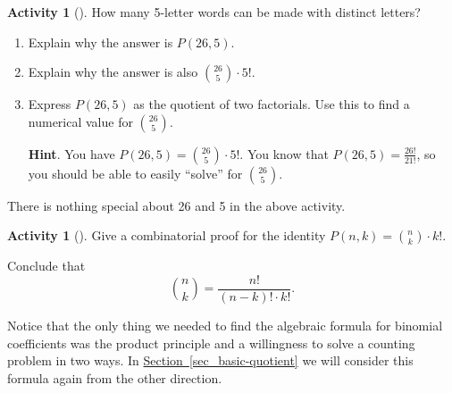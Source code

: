 \documentclass[10pt,]{book}
\theoremstyle{plain}
\theoremstyle{definition}
\theoremstyle{definition}
\theoremstyle{definition}
\newtheorem{activity}[project]{Activity}
\numberwithin{equation}{chapter}
\begin{document}
\begin{activity}[]\label{activity-85}
\hypertarget{p-668}{}%
How many 5-letter words can be made with distinct letters?%
\begin{enumerate}[font=\bfseries,label=(\alph*),ref=\alph*]
\item\label{task-136} \hypertarget{p-669}{}%
Explain why the answer is \(P(26,5)\).%
\item\label{task-137} \hypertarget{p-670}{}%
Explain why the answer is also \(\binom{26}{5}\cdot 5!\).%
\item\label{task-138} \hypertarget{p-671}{}%
Express \(P(26,5)\) as the quotient of two factorials.  Use this to find a numerical value for \(\binom{26}{5}\).%
\par\smallskip%
\noindent\textbf{Hint}.\hypertarget{hint-47}{}\quad%
\hypertarget{p-672}{}%
You have \(P(26,5) = \binom{26}{5}\cdot 5!\).  You know that \(P(26,5) = \frac{26!}{21!}\), so you should be able to easily ``solve'' for \(\binom{26}{5}\).%
\end{enumerate}
\end{activity}
\hypertarget{p-673}{}%
There is nothing special about 26 and 5 in the above activity.%
\begin{activity}[]\label{act-binomformula}
\hypertarget{p-674}{}%
Give a combinatorial proof for the identity \(P(n,k) = \binom{n}{k}\cdot k!\).%
\par
\hypertarget{p-675}{}%
Conclude that%
\begin{equation*}
\binom{n}{k} = \frac{n!}{(n-k)!\cdot k!}\text{.}
\end{equation*}
%
\end{activity}
\hypertarget{p-676}{}%
Notice that the only thing we needed to find the algebraic formula for binomial coefficients was the product principle and a willingness to solve a counting problem in two ways.  In \hyperref[sec_basic-quotient]{Section~\ref{sec_basic-quotient}} we will consider this formula again from the other direction.%
\typeout{************************************************}
\typeout{************************************************}
\end{document}
